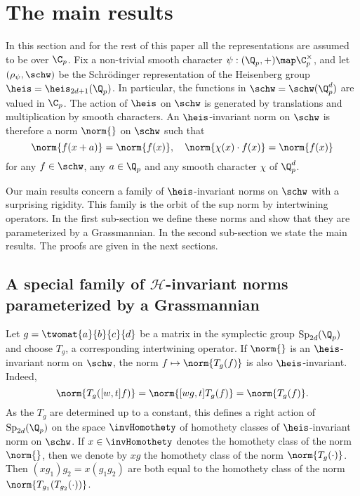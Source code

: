 \section{The main results}
In this section and for the rest of this paper all the representations are assumed to be over $\C_p$.
Fix a non-trivial smooth character $\psi:(\Q_p,+)\map \C_p^\times$, and let $(\rho_\psi,\schw)$ be the Schrödinger representation of the Heisenberg group $\heis=\heis_{2d+1}(\Q_p)$.
In particular, the functions in $\schw=\schw(\Q_p^d)$ are valued in $\C_p$.
The action of $\heis$ on $\schw$ is generated by translations and multiplication by smooth characters.
An $\heis$-invariant norm on $\schw$ is therefore a norm $\norm{}$ on $\schw$ such that
\[\norm{f(x+a)}=\norm{f(x)},\ \ \ \norm{\chi(x)\cdot f(x)}=\norm{f(x)}\]
 for any $f\in\schw$, any $a\in\Q_p$ and any smooth character $\chi$ of $\Q_p^d$.

Our main results concern a family of $\heis$-invariant norms on $\schw$ with a surprising rigidity.
This family is the orbit of the sup norm by intertwining operators.
In the first sub-section we define these norms and show that they are parameterized by a Grassmannian.
In the second sub-section we state the main results.
The proofs are given in the next sections.

\subsection{A special family of $\mathcal{H}$-invariant norms parameterized by a Grassmannian}
Let $g=\twomat{a}{b}{c}{d}$ be a matrix in the symplectic group $\mathrm{Sp}_{2d}(\Q_p)$ and choose $T_g$, a corresponding intertwining operator. 
If $\norm{}$ is an $\heis$-invariant norm on $\schw$, the norm $f\mapsto \norm{T_g(f)}$ is also $\heis$-invariant.
Indeed, 
\[\norm{T_g([w,t]f)}=\norm{[wg,t]T_g(f)}=\norm{T_g(f)}.\]
As the $T_g$ are determined up to a constant, this defines a right action of $\mathrm{Sp}_{2d}(\Q_p)$ on the space $\invHomothety$ of homothety classes of $\heis$-invariant norm on $\schw$.
If $x\in\invHomothety$ denotes the homothety class of the norm $\norm{}$, then we denote by $xg$ the homothety class of the norm $\norm{T_g(\cdot )}$.
Then $(xg_1)g_2=x(g_1g_2)$ are both equal to the homothety class of the norm $\norm{T_{g_1}(T_{g_2}(\cdot))}$.

